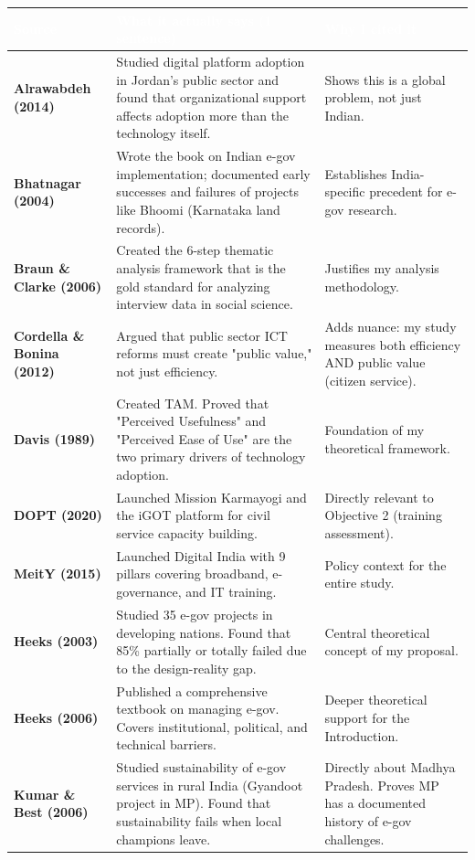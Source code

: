 \documentclass[11pt,a4paper]{article}
\begin{document}
\renewcommand{\arraystretch}{1.6}
\begin{tabularx}{\textwidth}{>{\bfseries\small}p{3.5cm} >{\small}X >{\small}p{3.8cm}}
\toprule
\rowcolor{navyblue}
\textcolor{white}{\bfseries Source} & \textcolor{white}{\bfseries What it actually says (1 sentence)} & \textcolor{white}{\bfseries Why I cited it} \\
\midrule
Alrawabdeh (2014) & Studied digital platform adoption in Jordan's public sector and found that organizational support affects adoption more than the technology itself. & Shows this is a global problem, not just Indian. \\
\rowcolor{lightbg}
Bhatnagar (2004) & Wrote the book on Indian e-gov implementation; documented early successes and failures of projects like Bhoomi (Karnataka land records). & Establishes India-specific precedent for e-gov research. \\
Braun \& Clarke (2006) & Created the 6-step thematic analysis framework that is the gold standard for analyzing interview data in social science. & Justifies my analysis methodology. \\
\rowcolor{lightbg}
Cordella \& Bonina (2012) & Argued that public sector ICT reforms must create "public value," not just efficiency. & Adds nuance: my study measures both efficiency AND public value (citizen service). \\
Davis (1989) & Created TAM. Proved that "Perceived Usefulness" and "Perceived Ease of Use" are the two primary drivers of technology adoption. & Foundation of my theoretical framework. \\
\rowcolor{lightbg}
DOPT (2020) & Launched Mission Karmayogi and the iGOT platform for civil service capacity building. & Directly relevant to Objective 2 (training assessment). \\
MeitY (2015) & Launched Digital India with 9 pillars covering broadband, e-governance, and IT training. & Policy context for the entire study. \\
\rowcolor{lightbg}
Heeks (2003) & Studied 35 e-gov projects in developing nations. Found that 85\% partially or totally failed due to the design-reality gap. & Central theoretical concept of my proposal. \\
Heeks (2006) & Published a comprehensive textbook on managing e-gov. Covers institutional, political, and technical barriers. & Deeper theoretical support for the Introduction. \\
\rowcolor{lightbg}
Kumar \& Best (2006) & Studied sustainability of e-gov services in rural India (Gyandoot project in MP). Found that sustainability fails when local champions leave. & Directly about Madhya Pradesh. Proves MP has a documented history of e-gov challenges. \\

\end{tabularx}
\end{document}
